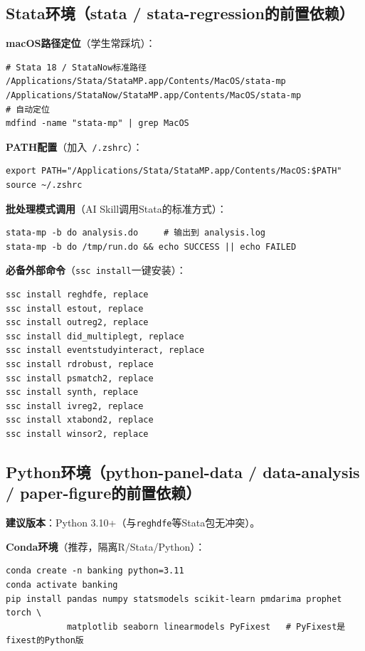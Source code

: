 \subsection{Stata环境（stata / stata-regression的前置依赖）}

\textbf{macOS路径定位}（学生常踩坑）：

\begin{lstlisting}[style=shell]
# Stata 18 / StataNow标准路径
/Applications/Stata/StataMP.app/Contents/MacOS/stata-mp
/Applications/StataNow/StataMP.app/Contents/MacOS/stata-mp
# 自动定位
mdfind -name "stata-mp" | grep MacOS
\end{lstlisting}

\textbf{PATH配置}（加入\texttt{~/.zshrc}）：

\begin{lstlisting}[style=shell]
export PATH="/Applications/Stata/StataMP.app/Contents/MacOS:$PATH"
source ~/.zshrc
\end{lstlisting}

\textbf{批处理模式调用}（AI Skill调用Stata的标准方式）：

\begin{lstlisting}[style=shell]
stata-mp -b do analysis.do     # 输出到 analysis.log
stata-mp -b do /tmp/run.do && echo SUCCESS || echo FAILED
\end{lstlisting}

\textbf{必备外部命令}（\texttt{ssc install}一键安装）：

\begin{lstlisting}[style=stata]
ssc install reghdfe, replace
ssc install estout, replace
ssc install outreg2, replace
ssc install did_multiplegt, replace
ssc install eventstudyinteract, replace
ssc install rdrobust, replace
ssc install psmatch2, replace
ssc install synth, replace
ssc install ivreg2, replace
ssc install xtabond2, replace
ssc install winsor2, replace
\end{lstlisting}

\subsection{Python环境（python-panel-data / data-analysis / paper-figure的前置依赖）}

\textbf{建议版本}：Python 3.10+（与\texttt{reghdfe}等Stata包无冲突）。

\textbf{Conda环境}（推荐，隔离R/Stata/Python）：

\begin{lstlisting}[style=shell]
conda create -n banking python=3.11
conda activate banking
pip install pandas numpy statsmodels scikit-learn pmdarima prophet torch \
            matplotlib seaborn linearmodels PyFixest   # PyFixest是fixest的Python版
\end{lstlisting}

